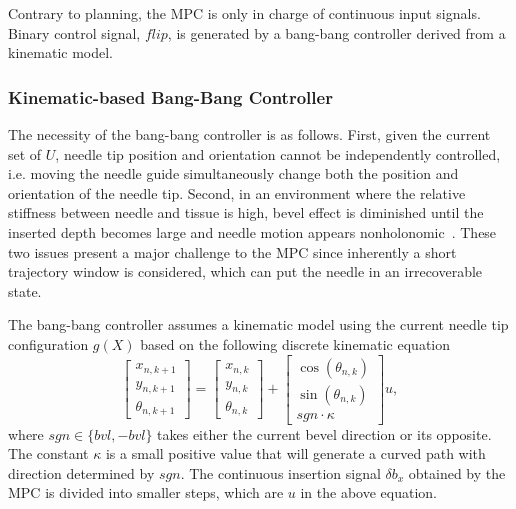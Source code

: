 Contrary to planning, the MPC is only in charge of continuous input signals. Binary control signal, $flip$, is generated by a bang-bang controller derived from a kinematic model.

\subsubsection{Kinematic-based Bang-Bang Controller}
\label{sec:chap-5-kinematic-models}
The necessity of the bang-bang controller is as follows. First, given the current set of $U$, needle tip position and orientation cannot be independently controlled, i.e. moving the needle guide simultaneously change both the position and orientation of the needle tip. Second, in an environment where the relative stiffness between needle and tissue is high, bevel effect is diminished until the inserted depth becomes large and needle motion appears nonholonomic~\parencite{lehmannDeflectionModelingNeedle2017}. These two issues present a major challenge to the MPC since inherently a short trajectory window is considered, which can put the needle in an irrecoverable state.

The bang-bang controller assumes a kinematic model using the current needle tip configuration $g(X)$ based on the following discrete kinematic equation
\begin{equation}
  \label{eq:chap-5-discrete-kinematic}
  \begin{bmatrix} x_{n, k + 1} \\ y_{n, k + 1} \\ \theta_{n, k + 1} \end{bmatrix} =
  \begin{bmatrix} x_{n, k} \\ y_{n, k} \\ \theta_{n, k}  \end{bmatrix} +
  \begin{bmatrix} \cos(\theta_{n, k}) \\ \sin(\theta_{n, k}) \\ sgn\cdot\kappa \end{bmatrix}u,
\end{equation}
where $sgn \in \{bvl, -bvl\}$ takes either the current bevel direction or its opposite. The constant $\kappa$ is a small positive value that will generate a curved path with direction determined by $sgn$. The continuous insertion signal $\delta b_x$ obtained by the MPC is divided into smaller steps, which are $u$ in the above equation. 

